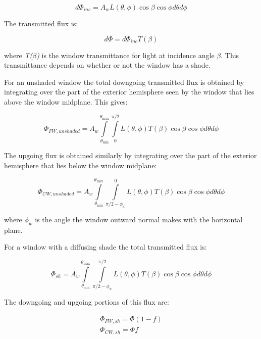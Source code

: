 \begin{equation}
d{\Phi_{inc}} = {A_w}L(\theta ,\phi )\cos \beta \cos \phi d\theta d\phi
\end{equation}

The transmitted flux is:

\begin{equation}
d\Phi  = d{\Phi_{inc}}T(\beta )
\end{equation}

where \emph{T($\beta$)} is the window transmittance for light at incidence angle \emph{$\beta$}. This transmittance depends on whether or not the window has a shade.

For an unshaded window the total downgoing transmitted flux is obtained by integrating over the part of the exterior hemisphere seen by the window that lies above the window midplane. This gives:

\begin{equation}
{\Phi_{FW,unshaded}} = {A_w}\int\limits_{{\theta_{\min }}}^{{\theta_{\max }}} {\int\limits_0^{\pi /2} {L(\theta ,\phi )T(\beta )\cos \beta \cos \phi d\theta d\phi } }
\label{eq:PhiFWUnshaded}
\end{equation}

The upgoing flux is obtained similarly by integrating over the part of the exterior hemisphere that lies below the window midplane:

\begin{equation}
{\Phi_{CW,unshaded}} = {A_w}\int\limits_{{\theta_{\min }}}^{{\theta_{\max }}} {\int\limits_{\pi /2 - {\phi_w}}^0 {L(\theta ,\phi )T(\beta )\cos \beta \cos \phi d\theta d\phi } }
\label{eq:PhiCWUnshaded}
\end{equation}

where \({\phi_w}\) is the angle the window outward normal makes with the horizontal plane.

For a window with a diffusing shade the total transmitted flux is:

\begin{equation}
{\Phi_{sh}} = {A_w}\int\limits_{{\theta_{\min }}}^{{\theta_{\max }}} {\int\limits_{\pi /2 - {\phi_w}}^{\pi /2} {L(\theta ,\phi )T(\beta )\cos \beta \cos \phi d\theta d\phi } }
\label{eq:PhiSh}
\end{equation}

The downgoing and upgoing portions of this flux are:

\begin{equation}
\begin{array}{l}
    \Phi_{FW,sh} = \Phi (1 - f) \\
    \Phi_{CW,sh} = \Phi f
\end{array}
\end{equation}

